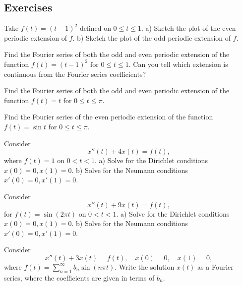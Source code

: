 \documentclass[12pt]{book}
\begin{document}
\subsection{Exercises}

\begin{exercise}
Take $f(t) = {(t-1)}^2$ defined on $0 \leq t \leq 1$.
a) Sketch the plot of the even periodic extension of $f$.
b) Sketch the plot of the odd periodic extension of $f$.
\end{exercise}

\begin{exercise}
Find the Fourier series of both the odd and even
periodic extension of 
the function $f(t) = {(t-1)}^2$ for $0 \leq t \leq 1$.
Can you tell which extension is continuous from the Fourier series
coefficients?
\end{exercise}

\begin{exercise}
Find the Fourier series of both the odd and even periodic extension of 
the function $f(t) = t$ for $0 \leq t \leq \pi$.
\end{exercise}

\begin{exercise}
Find the Fourier series of the even periodic extension of 
the function $f(t) = \sin t$ for $0 \leq t \leq \pi$.
\end{exercise}

\begin{exercise}
Consider
\begin{equation*}
x''(t) + 4 x(t) = f(t) ,
\end{equation*}
where $f(t) = 1$ on $0 < t < 1$.
a) Solve for the Dirichlet conditions $x(0)=0, x(1) = 0$.
b) Solve for the Neumann conditions $x'(0)=0, x'(1) = 0$.
\end{exercise}

\begin{exercise}
Consider
\begin{equation*}
x''(t) + 9 x(t) = f(t) ,
\end{equation*}
for $f(t) = \sin (2\pi t)$ on $0 < t < 1$.
a) Solve for the Dirichlet conditions $x(0)=0, x(1) = 0$.
b) Solve for the Neumann conditions $x'(0)=0, x'(1) = 0$.
\end{exercise}

\begin{exercise}
Consider
\begin{equation*}
x''(t) + 3 x(t) = f(t) , \quad x(0) = 0, \quad x(1) = 0,
\end{equation*}
where $f(t) = \sum_{n=1}^\infty b_n \sin (n \pi t)$.  Write the solution $x(t)$
as a Fourier series, where the coefficients are given in terms of $b_n$.
\end{exercise}
\end{document}
